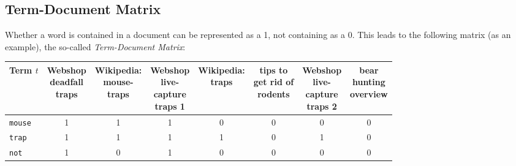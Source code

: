 		\subsection{Term-Document Matrix} %
			Whether a word is contained in a document can be represented as a 1, not containing as a 0. This leads to the following matrix (as an example), the so-called \textit{Term-Document Matrix}:
			\begin{table}[H]
				\centering
				\begin{tabular}{|l|c|c|c|c|c|c|c|}
					\hline
					\textbf{Term} \(t\) & \makecell{Webshop \\ deadfall \\ traps} & \makecell{Wikipedia: \\ mouse- \\ traps} & \makecell{Webshop \\ live- \\ capture \\ traps 1} & \makecell{Wikipedia: \\ traps} & \makecell{tips to \\ get rid of \\ rodents} & \makecell{Webshop \\ live- \\ capture \\ traps 2} & \makecell{bear \\ hunting \\ overview} \\ \hline
					\texttt{mouse}      & 1                                       & 1                                        & 1                                                 & \textcolor{irl}{0}             & \textcolor{irl}{0}                          & \textcolor{irl}{0}                                & \textcolor{irl}{0}                     \\ \hline
					\texttt{trap}       & 1                                       & 1                                        & 1                                                 & 1                              & \textcolor{irl}{0}                          & 1                                                 & \textcolor{irl}{0}                     \\ \hline
					\texttt{not}        & 1                                       & \textcolor{irl}{0}                       & 1                                                 & \textcolor{irl}{0}             & \textcolor{irl}{0}                          & \textcolor{irl}{0}                                & \textcolor{irl}{0}                     \\ \hline

\end{tabular}
\end{table}
